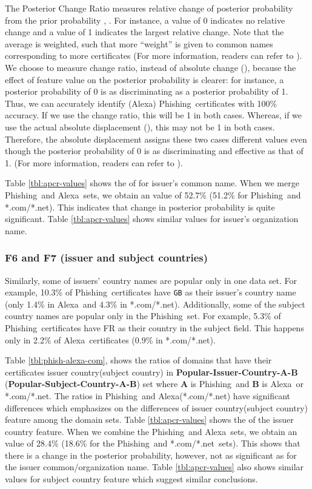 \documentclass[twocolumn]{article}
\newcommand{\Alexa}{\textsf{Alexa}}
\newcommand{\phishing}{\textsf{Phishing}}
\newcommand{\comnet}{\textsf{*.com/*.net}}
\begin{document}
The Posterior Change Ratio measures relative change of posterior probability  from the prior probability
, . For instance, a value of 0 indicates no relative change and a value of 
1 indicates the largest relative change. Note that 
the average is weighted, such that more ``weight'' is given to common names 
corresponding to more certificates  (For more information, readers can refer to \cite{ads-portal-class}). 
We choose to measure change ratio, instead of absolute change 
(), because the effect of feature value on the posterior probability is clearer: for 
instance, a posterior probability of 0 is as discriminating as a posterior probability of 1. Thus, we 
can accurately identify (\Alexa) \phishing\ certificates with 100\% accuracy. 
If we use the change ratio, this will be 1 in both cases. Whereas, if we use the actual absolute displacement (), this 
may not be 1 in both cases. Therefore, the absolute displacement assigns these two cases different values even though 
the posterior probability of 0 is as discriminating and effective as that of 1. (For more information, readers can refer to \cite{ads-portal-class}).
\fi

Table \ref{tbl:apcr-values} shows the  of for issuer's common name. When we merge \phishing\ and \Alexa\ sets, we obtain an  value 
of 52.7\% (51.2\% for \phishing\ and \comnet). This indicates that change in posterior probability is quite significant.
Table \ref{tbl:apcr-values} shows similar   values for issuer's organization name. 


\subsubsection*{F6 and F7 (issuer and subject countries)} \noindent
Similarly, some of issuers' country names are popular only in  one data set. For example, 10.3\% of  \phishing\ certificates have {\tt GB} as their issuer's country name
(only 1.4\% in \Alexa\ and 4.3\% in \comnet). Additionally, some of the subject country names are popular only in the \phishing\ set. For example, 5.3\% of  \phishing\ certificates have FR  as their country in the subject field. This happens only in 2.2\% of \Alexa\ certificates (0.9\% in \comnet).

Table \ref{tbl:phish-alexa-com}, shows the ratios of domains that have their certificates issuer country(subject country) in \textbf{Popular-Issuer-Country-A-B} (\textbf{Popular-Subject-Country-A-B}) set where \textbf{A} is \phishing\ and \textbf{B} is \Alexa\ or \comnet. The ratios in \phishing\ and \Alexa(\comnet) have significant differences which emphasizes on the differences of issuer country(subject country) feature among the domain sets. Table \ref{tbl:apcr-values} shows the  of the issuer country  feature. When we combine the \phishing\ and \Alexa\ sets, we obtain an  value of 28.4\% (18.6\% for the \phishing\ and \comnet\ sets). This shows that there is a change in the posterior probability, however, not as significant as for the issuer common/organization name. Table \ref{tbl:apcr-values} also shows similar   values for subject country feature which suggest similar conclusions.  
\end{document}
